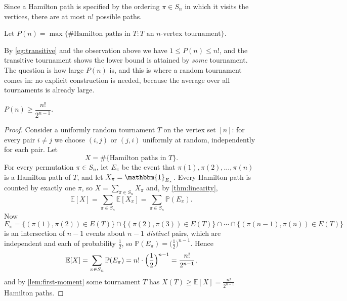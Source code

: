 \begin{observation}\label{obs:n-factorial}
    Since a Hamilton path is specified by the ordering \(\pi \in S_n\) in which it visits the vertices, there are at most \(n!\) possible paths.
\end{observation}

\begin{definition}\label{def:P-n}
    Let \(P(n) = \max \{ \#\text{Hamilton paths in } T : T \text{ an } n\text{-vertex tournament} \}\).
\end{definition}

By \autoref{eg:transitive} and the observation above we have \(1 \le P(n) \le n!\), and the transitive tournament shows the lower bound is attained by \emph{some} tournament. The question is how large \(P(n)\) is, and this is where a random tournament comes in: no explicit construction is needed, because the average over all tournaments is already large.

\begin{proposition}[Szele, 1943]\label{prop:szele-lower}
    \(P(n) \ge \dfrac{n!}{2^{n-1}}\).
\end{proposition}

\begin{proof}
    Consider a uniformly random tournament \(T\) on the vertex set \([n]\): for every pair \(i \ne j\) we choose \((i,j)\) or \((j,i)\) uniformly at random, independently for each pair. Let
    \[
        X = \#\{\text{Hamilton paths in } T\}.
    \]
    For every permutation \(\pi \in S_n\), let \(E_\pi\) be the event that \(\pi(1), \pi(2), \ldots, \pi(n)\) is a Hamilton path of \(T\), and let \(X_\pi = \mathbbm{1}_{E_\pi}\). Every Hamilton path is counted by exactly one \(\pi\), so \(X = \sum_{\pi \in S_n} X_\pi\) and, by \autoref{thm:linearity},
    \[
        \mathbb{E}[X] = \sum_{\pi \in S_n} \mathbb{E}[X_\pi] = \sum_{\pi \in S_n} \mathbb{P}(E_\pi).
    \]
    Now
    \[
        E_\pi = \bigl\{ (\pi(1), \pi(2)) \in E(T) \bigr\} \cap \bigl\{ (\pi(2), \pi(3)) \in E(T) \bigr\} \cap \cdots \cap \bigl\{ (\pi(n-1), \pi(n)) \in E(T) \bigr\}
    \]
    is an intersection of \(n-1\) events about \(n-1\) \emph{distinct} pairs, which are independent and each of probability \(\frac{1}{2}\), so \(\mathbb{P}(E_\pi) = \bigl( \frac{1}{2} \bigr)^{n-1}\). Hence
    \[
        \mathbb{E}[X] = \sum_{\pi \in S_n} \mathbb{P}(E_\pi) = n! \cdot \Bigl( \frac{1}{2} \Bigr)^{n-1} = \frac{n!}{2^{n-1}},
    \]
    and by \autoref{lem:first-moment} some tournament \(T\) has \(X(T) \ge \mathbb{E}[X] = \frac{n!}{2^{n-1}}\) Hamilton paths.
\end{proof}

